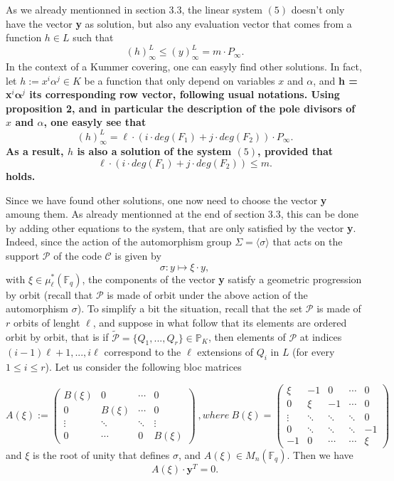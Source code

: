 \documentclass[10pt]{article}
\newcommand{\s}{\vspace{0.3cm}}
\newcommand{\cd}{\cdot}
\newcommand{\fq}{\mathbb{F}_q}
\newcommand{\PR}{\mathcal{P}}
\begin{document}
\s

As we already mentionned in section 3.3, the linear system $(5)$ doesn't only have the vector \textbf{y} as solution, but also any evaluation vector that comes from a function $h \in L$ such that 
\[(h)^L_{\infty} \leq (y)^L_{\infty} = m \cd P_{\infty}.\]
In the context of a Kummer covering, one can easyly find other solutions. In fact, let $h := x^i\alpha^j \in K$ be a function that only depend on variables $x$ and $\alpha$, and \bf{h} \rm = \textbf{x}$^i\boldsymbol{\alpha}^j$ \rm its corresponding row vector, following usual notations. Using proposition 2, and in particular the description of the pole divisors of $x$ and $\alpha$, one easyly see that 
\[ (h)^L_{\infty} = \ell \cd \left(i \cd deg(F_1)+j \cd deg(F_2)\right) \cd P_{\infty}.\]
As a result, $h$ is also a solution of the system $(5)$, provided that
\[\ell \cd \left(i \cd deg(F_1)+j \cd deg(F_2)\right) \leq m.\]
holds.

\s

Since we have found other solutions, one now need to choose the vector \textbf{y} amoung them. As already mentionned at the end of section 3.3, this can be done by adding other equations to the system, that are only satisfied by the vector \textbf{y}. Indeed, since the action of the automorphism group $\Sigma = \langle\sigma\rangle$ that acts on the support $\PR$ of the code $\mathcal{C}$ is given by 
\[\sigma : y \longmapsto \xi \cd y,\]
with $\xi \in \mu^*_{\ell}(\fq)$, the components of the vector \textbf{y} satisfy a geometric progression by orbit (recall that $\PR$ is made of orbit under the above action of the automorphism $\sigma$). To simplify a bit the situation, recall that the set $\PR$ is made of $r$ orbits of lenght $\ell$, and suppose in what follow that its elements are ordered orbit by orbit, that is if $\tilde{\PR} = \{Q_1,...,Q_r\} \in \mathbb{P}_K$, then elements of $\PR$ at indices $(i-1)\ell+1,...,i\ell$ correspond to the $\ell$ extensions of $Q_{i}$ in $L$ (for every $1\leq i \leq r$). Let us consider the following bloc matrices

\begin{equation*}
A(\xi) := 
\begin{pmatrix}
B(\xi) & 0 & \cdots & 0 \\
0 & B(\xi) & \cdots & 0 \\
\vdots & \ddots & \ddots & \vdots \\
0 & \cdots & 0 & B(\xi)
\end{pmatrix} \ , where \ 
B(\xi) = 
\begin{pmatrix}
\xi & -1 & 0 & \cdots & 0 \\
0 & \xi & -1 & \cdots & 0 \\
\vdots & \ddots & \ddots & \ddots & 0 \\
0 & \ddots & \ddots & \ddots & -1 \\
-1 & 0 & \cdots & \cdots & \xi
\end{pmatrix}
\end{equation*}
and $\xi$ is the root of unity that defines $\sigma$, and $A(\xi) \in M_{n}(\fq)$. Then we have
\begin{equation*}
A(\xi) \cd \textbf{y}^T
= 0.
\end{equation*}
\end{document}
